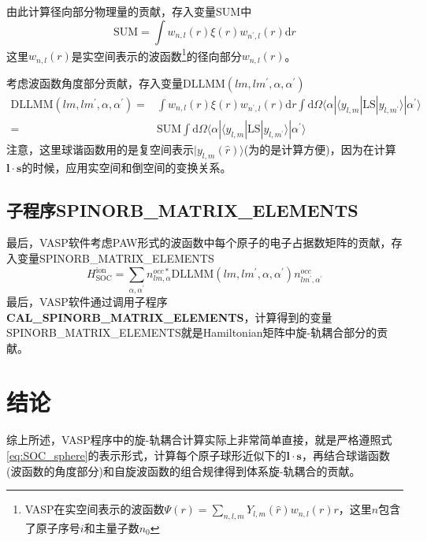 \documentclass[10pt, oneside, a4paper]{article}      %
\begin{document}
由此计算径向部分物理量的贡献，存入变量\textrm{SUM}中
\begin{displaymath}
	\mathrm{SUM}=\int w_{n,l}(r)\xi(r)w_{n^{\prime},l}(r)\mathrm{d}r
\end{displaymath}
这里$w_{n,l}(r)$是实空间表示的波函数\footnote{\textrm{VASP}在实空间表示的波函数$\Psi(r)=\sum\limits_{n,l,m}Y_{l,m}(\hat{r})w_{n,l}(r)r$，这里$n$包含了原子序号$i$和主量子数$n_0$}的径向部分$w_{n,l}(r)$。

考虑波函数角度部分贡献，存入变量$\mathrm{DLLMM}(lm,lm^{\prime},\alpha,\alpha^{\prime})$
\begin{displaymath}
	\begin{aligned}
		\mathrm{DLLMM}(lm,lm^{\prime},\alpha,\alpha^{\prime})=&\int w_{n,l}(r)\xi(r)w_{n^{\prime},l}(r)\mathrm{d}r\int\mathrm{d}\Omega\langle\alpha|\langle y_{l,m}|\mathrm{LS}|y_{l,m^{\prime}}\rangle|\alpha^{\prime}\rangle\\
		=&\mathrm{SUM}\int\mathrm{d}\Omega\langle\alpha|\langle y_{l,m}|\mathrm{LS}|y_{l,m^{\prime}}\rangle|\alpha^{\prime}\rangle
	\end{aligned}
\end{displaymath}
注意，这里球谐函数用的是复空间表示$|y_{l,m}(\hat r)\rangle$(为的是计算方便)，因为在计算$\mathbf{l}\cdot\mathbf{s}$的时候，应用实空间和倒空间的变换关系。

\subsection{子程序\bf{SPINORB\_MATRIX\_ELEMENTS}}
最后，\textrm{VASP}软件考虑\textrm{PAW}形式的波函数中每个原子的电子占据数矩阵的贡献，存入变量\textrm{SPINORB\_MATRIX\_ELEMENTS}
\begin{displaymath}
	H_{\mathrm{SOC}}^{\mathrm{ion}}=\sum_{\alpha,\alpha^{\prime}}n_{lm,\alpha}^{occ\ast}\mathrm{DLLMM}(lm,lm^{\prime},\alpha,\alpha^{\prime})n_{lm^{\prime},\alpha^{\prime}}^{occ}
\end{displaymath}
最后，\textrm{VASP}软件通过调用子程序\textbf{CAL\_SPINORB\_MATRIX\_ELEMENTS}，计算得到的变量\textrm{SPINORB\_MATRIX\_ELEMENTS}就是\textrm{Hamiltonian}矩阵中旋-轨耦合部分的贡献。

\section{结论}
综上所述，\textrm{VASP}程序中的旋-轨耦合计算实际上非常简单直接，就是严格遵照式\eqref{eq:SOC_sphere}的表示形式，计算每个原子球形近似下的$\mathbf{l}\cdot\mathbf{s}$，再结合球谐函数(波函数的角度部分)和自旋波函数的组合规律得到体系旋-轨耦合的贡献。
\end{document}
